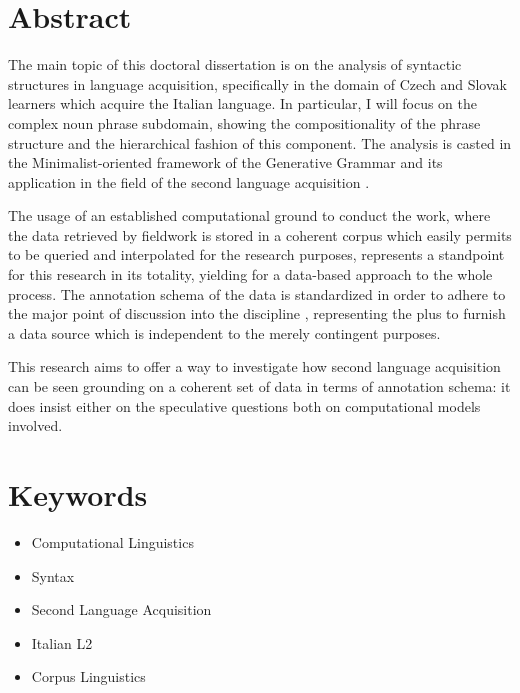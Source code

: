 \documentclass[a4paper,twoside,11pt,chapterprefix=false,bibliography=totocnumbered]{scrbook}
\providecommand{\tightlist}{%
  \setlength{\itemsep}{0pt}\setlength{\parskip}{0pt}}
\theoremstyle{definition}
\theoremstyle{definition}
\theoremstyle{definition}
\theoremstyle{remark}
\begin{document}
\section*{Abstract}\label{abstract}

The main topic of this doctoral dissertation is on the analysis of
syntactic structures in language acquisition, specifically in the domain
of Czech and Slovak learners which acquire the Italian language. In
particular, I will focus on the complex noun phrase subdomain, showing
the compositionality of the phrase structure and the hierarchical
fashion of this component. The analysis is casted in the
Minimalist-oriented framework of the Generative Grammar
\citep{chomsky1995, chomsky1998, chomsky2013, hcf2002} and its
application in the field of the second language acquisition
\citep{rothman_slabakova_2017, doi:10.1093/applin/amu027}.

The usage of an established computational ground to conduct the work,
where the data retrieved by fieldwork is stored in a coherent corpus
which easily permits to be queried and interpolated for the research
purposes, represents a standpoint for this research in its totality,
yielding for a data-based approach to the whole process. The annotation
schema of the data is standardized in order to adhere to the major point
of discussion into the discipline
\citep{kurdi_natural_2016-2, clark_handbook_2010-1, kuebler-corpus_linguistics},
representing the plus to furnish a data source which is independent to
the merely contingent purposes.

This research aims to offer a way to investigate how second language
acquisition can be seen grounding on a coherent set of data in terms of
annotation schema: it does insist either on the speculative questions
both on computational models involved.

\section*{Keywords}\label{keywords}

\begin{itemize}
\tightlist
\item
  Computational Linguistics
\item
  Syntax
\item
  Second Language Acquisition
\item
  Italian L2
\item
  Corpus Linguistics
\end{itemize}
\end{document}
